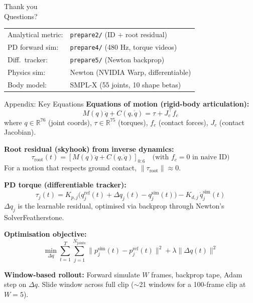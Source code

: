 \documentclass[aspectratio=169, 10pt]{beamer}
\begin{document}
\begin{frame}[plain]
  \begin{center}
    \vspace{1.5cm}
    {\LARGE Thank you}\\[1em]
    \large Questions?\\[2em]
    \small
    \begin{tabular}{ll}
      Analytical metric: & \texttt{prepare2/} (ID + root residual) \\
      PD forward sim:    & \texttt{prepare4/} (480 Hz, torque videos) \\
      Diff.\ tracker:    & \texttt{prepare5/} (Newton backprop) \\
      Physics sim:       & Newton (NVIDIA Warp, differentiable) \\
      Body model:        & SMPL-X (55 joints, 10 shape betas) \\
    \end{tabular}
  \end{center}
\end{frame}


\appendix

\begin{frame}[allowframebreaks]{Appendix: Key Equations}
  \textbf{Equations of motion (rigid-body articulation):}
  \[
    M(q)\ddot{q} + C(q, \dot{q}) = \tau + J_c^\top f_c
  \]
  where $q \in \mathbb{R}^{76}$ (joint coords), $\tau \in \mathbb{R}^{75}$ (torques),
  $f_c$ (contact forces), $J_c$ (contact Jacobian).

  \vspace{0.8em}
  \textbf{Root residual (skyhook) from inverse dynamics:}
  \[
    \tau_\text{root}(t) = \left[M(q)\ddot{q} + C(q,\dot{q})\right]_{0:6}
    \quad \text{(with } f_c = 0 \text{ in naive ID)}
  \]
  For a motion that respects ground contact, $\|\tau_\text{root}\| \approx 0$.

  \vspace{0.8em}
  \textbf{PD torque (differentiable tracker):}
  \[
    \tau_j(t) = K_{p,j}\bigl(q_j^\text{ref}(t) + \Delta q_j(t) - q_j^\text{sim}(t)\bigr)
              - K_{d,j}\,\dot{q}_j^\text{sim}(t)
  \]
  $\Delta q_j$ is the learnable residual, optimised via backprop through Newton's
  SolverFeatherstone.

  \framebreak

  \textbf{Optimisation objective:}
  \[
    \min_{\Delta q} \sum_{t=1}^{T} \sum_{j=1}^{N_\text{joints}}
    \|p_j^\text{sim}(t) - p_j^\text{ref}(t)\|^2
    + \lambda \|\Delta q(t)\|^2
  \]

  \textbf{Window-based rollout:}
  Forward simulate $W$ frames, backprop tape, Adam step on $\Delta q$.
  Slide window across full clip ($\sim$21 windows for a 100-frame clip at $W=5$).
\end{frame}
\end{document}
